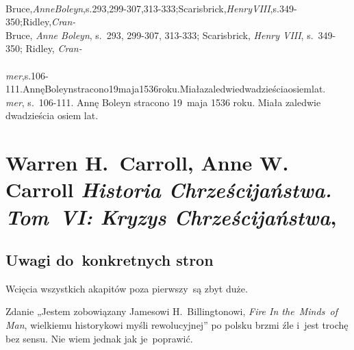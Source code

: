 \documentclass[a4paper,11pt]{article}
\begin{document}
\VerSpaceSix


\noindent
{} \\
\Jest Bruce,\textit{AnneBoleyn},s.293,299-307,313-333;Scarisbrick,\textit{HenryVIII},s.349-350;Ridley,\textit{Cran-} \\
\Powin Bruce, \textit{Anne Boleyn}, s.~293, 299-307, 313-333; Scarisbrick,
\textit{Henry VIII}, s.~349-350; Ridley, \textit{Cran-} \\
 \\
\Jest
\textit{mer},s.106-111.AnnęBoleynstracono19maja1536roku.Miałazaledwiedwadzieściaosiemlat. \\
\Powin \textit{mer}, s.~106-111. Annę Boleyn stracono 19~maja 1536 roku.
Miała zaledwie dwadzieścia osiem lat. \\












\section{Warren H.~Carroll, Anne W. Carroll
  \textit{Historia Chrześcijaństwa. Tom~VI: Kryzys Chrześcijaństwa},
  \cite{CarrollCarrollHistoriaChrzecijanstwaVolVI2014}}



\subsection{Uwagi do~konkretnych stron}



\noindent
{} Wcięcia wszystkich akapitów poza pierwszy~są zbyt duże.

\VerSpaceFour





\noindent
{} Zdanie „Jestem zobowiązany Jamesowi H.~Billingtonowi,
\textit{Fire In the~Minds~of Man}, wielkiemu historykowi myśli
rewolucyjnej” po polsku brzmi źle i~jest trochę bez sensu. Nie wiem jednak
jak je~poprawić.

\VerSpaceFour
\end{document}
